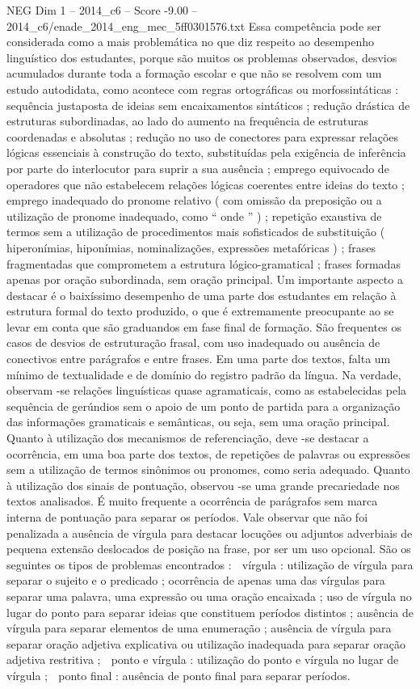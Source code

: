 \begin{textsample}{NEG Dim 1 – 2014\_c6 – Score -9.00 – 2014\_c6/enade\_2014\_eng\_mec\_5ff0301576.txt}
Essa competência pode ser considerada como a mais problemática no que diz respeito ao desempenho linguístico dos estudantes, porque são muitos os problemas observados, desvios acumulados durante toda a formação escolar e que não se resolvem com um estudo autodidata, como acontece com regras ortográficas ou morfossintáticas : sequência justaposta de ideias sem encaixamentos sintáticos ; redução drástica de estruturas subordinadas, ao lado do aumento na frequência de estruturas coordenadas e absolutas ; redução no uso de conectores para expressar relações lógicas essenciais à construção do texto, substituídas pela exigência de inferência por parte do interlocutor para suprir a sua ausência ; emprego equivocado de operadores que não estabelecem relações lógicas coerentes entre ideias do texto ; emprego inadequado do pronome relativo ( com omissão da preposição ou a utilização de pronome inadequado, como “ onde ” ) ; repetição exaustiva de termos sem a utilização de procedimentos mais sofisticados de substituição ( hiperonímias, hiponímias, nominalizações, expressões metafóricas ) ; frases fragmentadas que comprometem a estrutura lógico-gramatical ; frases formadas apenas por oração subordinada, sem oração principal.
Um importante aspecto a destacar é o baixíssimo desempenho de uma parte dos estudantes em relação à estrutura formal do texto produzido, o que é extremamente preocupante ao se levar em conta que são graduandos em fase final de formação.
São frequentes os casos de desvios de estruturação frasal, com uso inadequado ou ausência de conectivos entre parágrafos e entre frases.
Em uma parte dos textos, falta um mínimo de textualidade e de domínio do registro padrão da língua.
Na verdade, observam -se relações linguísticas quase agramaticais, como as estabelecidas pela sequência de gerúndios sem o apoio de um ponto de partida para a organização das informações gramaticais e semânticas, ou seja, sem uma oração principal.
Quanto à utilização dos mecanismos de referenciação, deve -se destacar a ocorrência, em uma boa parte dos textos, de repetições de palavras ou expressões sem a utilização de termos sinônimos ou pronomes, como seria adequado.
Quanto à utilização dos sinais de pontuação, observou -se uma grande precariedade nos textos analisados.
É muito frequente a ocorrência de parágrafos sem marca interna de pontuação para separar os períodos.
Vale observar que não foi penalizada a ausência de vírgula para destacar locuções ou adjuntos adverbiais de pequena extensão deslocados de posição na frase, por ser um uso opcional.
São os seguintes os tipos de problemas encontrados :  vírgula : utilização de vírgula para separar o sujeito e o predicado ; ocorrência de apenas uma das vírgulas para separar uma palavra, uma expressão ou uma oração encaixada ; uso de vírgula no lugar do ponto para separar ideias que constituem períodos distintos ; ausência de vírgula para separar elementos de uma enumeração ; ausência de vírgula para separar oração adjetiva explicativa ou utilização inadequada para separar oração adjetiva restritiva ;  ponto e vírgula : utilização do ponto e vírgula no lugar de vírgula ;  ponto final : ausência de ponto final para separar períodos.

\end{textsample}
